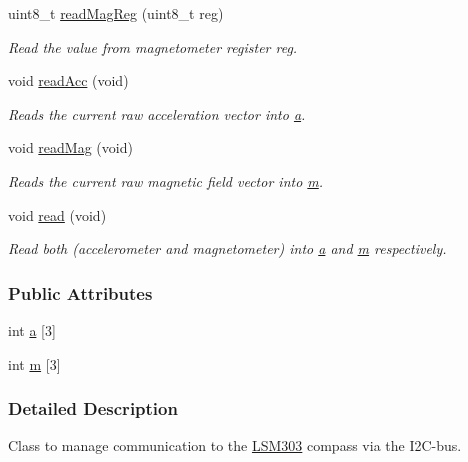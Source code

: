 \begin{DoxyCompactItemize}
uint8\-\_\-t \hyperlink{class_l_s_m303_a5d6d0b492501b76b7fde821036205bda}{read\-Mag\-Reg} (uint8\-\_\-t reg)
\begin{DoxyCompactList}\small\item\em \-Read the value from magnetometer register reg. \end{DoxyCompactList}\item 
void \hyperlink{class_l_s_m303_ac1396a51b288eadc41fd19fbd79ef68e}{read\-Acc} (void)
\begin{DoxyCompactList}\small\item\em \-Reads the current raw acceleration vector into \hyperlink{class_l_s_m303_ad71c39fa2c1dfd978c9e93b48a6a9310}{a}. \end{DoxyCompactList}\item 
void \hyperlink{class_l_s_m303_abc93e8d8101c6b00df2ae85c5f8ded9e}{read\-Mag} (void)
\begin{DoxyCompactList}\small\item\em \-Reads the current raw magnetic field vector into \hyperlink{class_l_s_m303_a606cb6a86d385c4c4a9767f6b1bf2ea5}{m}. \end{DoxyCompactList}\item 
void \hyperlink{class_l_s_m303_a9f40456878f534bba32490d19f3a64ce}{read} (void)
\begin{DoxyCompactList}\small\item\em \-Read both (accelerometer and magnetometer) into \hyperlink{class_l_s_m303_ad71c39fa2c1dfd978c9e93b48a6a9310}{a} and \hyperlink{class_l_s_m303_a606cb6a86d385c4c4a9767f6b1bf2ea5}{m} respectively. \end{DoxyCompactList}\end{DoxyCompactItemize}
\subsubsection*{\-Public \-Attributes}
\begin{DoxyCompactItemize}
\item 
int \hyperlink{class_l_s_m303_ad71c39fa2c1dfd978c9e93b48a6a9310}{a} \mbox{[}3\mbox{]}
\item 
int \hyperlink{class_l_s_m303_a606cb6a86d385c4c4a9767f6b1bf2ea5}{m} \mbox{[}3\mbox{]}
\end{DoxyCompactItemize}


\subsubsection{\-Detailed \-Description}
\-Class to manage communication to the \hyperlink{class_l_s_m303}{\-L\-S\-M303} compass via the \-I2\-C-\/bus. 

